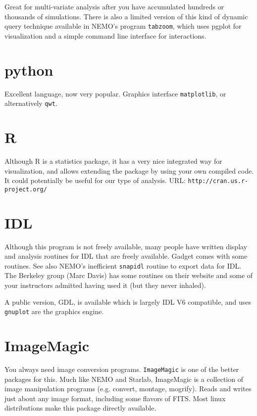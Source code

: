 {Great for multi-variate analysis after you have accumulated hundreds
or thousands of simulations. There is also a limited version of
this kind of dynamic query technique available in 
NEMO's program {\tt tabzoom}, which uses pgplot for visualization
and a simple command line interface for interactions.

\section{python}

Excellent language, now very popular. Graphics interface {\tt matplotlib},
or alternatively {\tt qwt}.


\section{R}

Although R is a statistics package, it has a very nice integrated
way for visualization, and allows extending the package by using
your own compiled code. It could potentially be useful for our
type of analysis. URL: {\tt http://cran.us.r-project.org/}


\section{IDL}

Although this program is not freely available, 
many people have written display and 
analysis routines for IDL that are freely available.
Gadget comes with some
routines. See also NEMO's inefficient {\tt snapidl} routine to export data for IDL.
The Berkeley group (Marc Davis) has some routines on their website
and some of your instructors admitted having used it (but they never inhaled).

A public version, GDL,  is available which is largely IDL V6 compatible, and uses
{\tt gnuplot} are the graphics engine.


\section{ImageMagic}

You always need image conversion programs. {\tt ImageMagic} is one of 
the better packages for this. Much like NEMO and Starlab, ImageMagic
is a collection of image manipulation programs (e.g. convert, montage, mogrify).
Reads and writes just about any image format, including some flavors
of FITS. Most linux
distributions make this package directly available.


}
